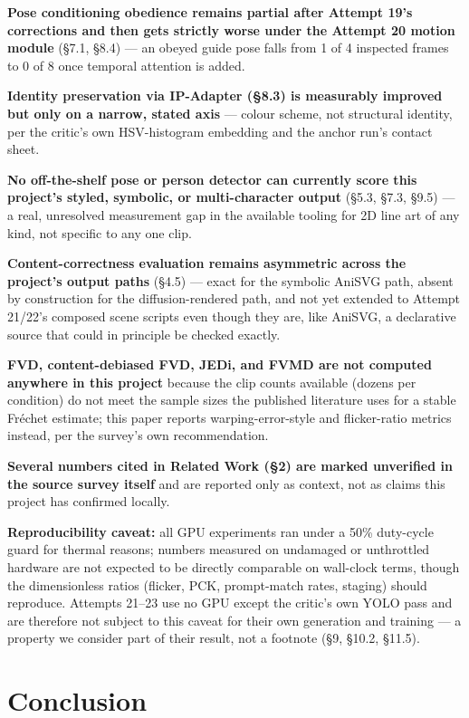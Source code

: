 \documentclass[11pt]{article}
\newcommand{\secsym}{\S}
\begin{document}
\textbf{Pose conditioning obedience remains partial after Attempt 19's
corrections and then gets strictly worse under the Attempt 20 motion
module} (\secsym7.1, \secsym8.4) --- an obeyed guide pose falls from 1 of
4 inspected frames to 0 of 8 once temporal attention is added.

\textbf{Identity preservation via IP-Adapter (\secsym8.3) is measurably
improved but only on a narrow, stated axis} --- colour scheme, not
structural identity, per the critic's own HSV-histogram embedding and the
anchor run's contact sheet.

\textbf{No off-the-shelf pose or person detector can currently score
this project's styled, symbolic, or multi-character output} (\secsym5.3,
\secsym7.3, \secsym9.5) --- a real, unresolved measurement gap in the
available tooling for 2D line art of any kind, not specific to any one
clip.

\textbf{Content-correctness evaluation remains asymmetric across the
project's output paths} (\secsym4.5) --- exact for the symbolic AniSVG
path, absent by construction for the diffusion-rendered path, and not
yet extended to Attempt 21/22's composed scene scripts even though they
are, like AniSVG, a declarative source that could in principle be
checked exactly.

\textbf{FVD, content-debiased FVD, JEDi, and FVMD are not computed
anywhere in this project} because the clip counts available (dozens per
condition) do not meet the sample sizes the published literature uses
for a stable Fr\'echet estimate; this paper reports warping-error-style
and flicker-ratio metrics instead, per the survey's own recommendation.

\textbf{Several numbers cited in Related Work (\secsym2) are marked
unverified in the source survey itself} and are reported only as
context, not as claims this project has confirmed locally.

\textbf{Reproducibility caveat:} all GPU experiments ran under a 50\%
duty-cycle guard for thermal reasons; numbers measured on undamaged or
unthrottled hardware are not expected to be directly comparable on
wall-clock terms, though the dimensionless ratios (flicker, PCK,
prompt-match rates, staging) should reproduce. Attempts 21--23 use no GPU
except the critic's own YOLO pass and are therefore not subject to this
caveat for their own generation and training --- a property we consider
part of their result, not a footnote (\secsym9, \secsym10.2,
\secsym11.5).

\section{Conclusion}
\label{sec:conclusion}
\end{document}
